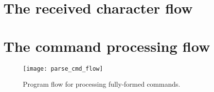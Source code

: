 \clearpage{}
\section{The received character flow}








\clearpage{}
\section{The command processing flow}

\begin{figure}[ht]
    \begin{center}
        \texttt{[image: parse\_cmd\_flow]}
        \caption{Program flow for processing fully-formed commands.\label{fig:cmdflow}}
    \end{center}
\end{figure}






